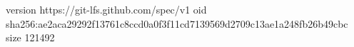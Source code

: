 version https://git-lfs.github.com/spec/v1
oid sha256:ae2aca29292f13761c8ccd0a0f3f11cd7139569d2709c13ae1a248fb26b49cbc
size 121492
